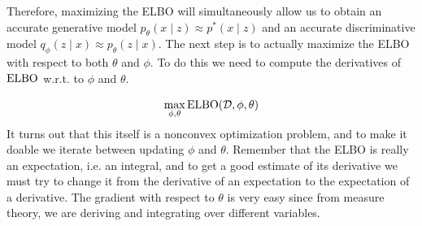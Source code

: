   Therefore, maximizing the ELBO will simultaneously allow us to obtain an accurate generative model $p_\theta (x \mid z) \approx p^\ast (x \mid z)$ and an accurate discriminative model $q_\phi (z \mid x) \approx p_\theta (z \mid x)$. The next step is to actually maximize the ELBO with respect to both $\theta$ and $\phi$. To do this we need to compute the derivatives of $\operatorname{ELBO}$ w.r.t. to $\phi$ and $\theta$. 

  \begin{equation}
    \max_{\phi, \theta} \operatorname{ELBO}(\mathcal{D}, \phi, \theta)
  \end{equation}
  It turns out that this itself is a nonconvex optimization problem, and to make it doable we iterate between updating $\phi$ and $\theta$. Remember that the ELBO is really an expectation, i.e. an integral, and to get a good estimate of its derivative we must try to change it from the derivative of an expectation to the expectation of a derivative. The gradient with respect to $\theta$ is very easy since from measure theory, we are deriving and integrating over different variables. 

